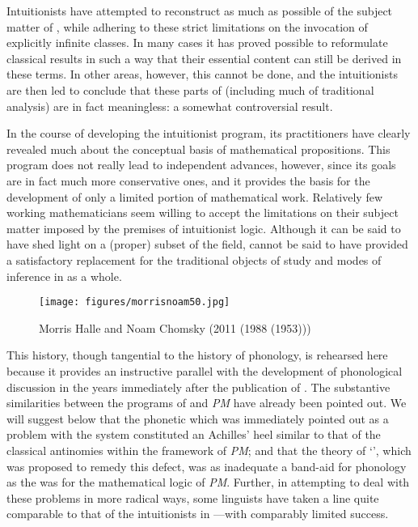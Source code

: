 Intuitionists have attempted to reconstruct as much as possible of the
subject matter of , while adhering to these strict
limitations on the invocation of explicitly infinite classes. In many
cases it has proved possible to reformulate classical results in such
a way that their essential content can still be derived in these
terms. In other areas, however, this cannot be done, and the
intuitionists are then led to conclude that these parts of 
(including much of traditional analysis) are in fact meaningless: a
somewhat controversial result.

In the course of developing the intuitionist program, its
practitioners have clearly revealed much about the conceptual basis of
mathematical propositions. This program does not really lead to
independent advances, however, since its goals are in fact much more
conservative ones, and it provides the basis for the development of
only a limited portion of mathematical work. Relatively few working
mathematicians seem willing to accept the limitations on their subject
matter imposed by the premises of intuitionist logic. Although it can
be said to have shed light on a (proper) subset of the field,
 cannot be said to have provided a satisfactory
replacement for the traditional objects of study and modes of
inference in  as a whole.

\begin{wrapfigure}{l}{.45\textwidth}
  \texttt{[image: figures/morrisnoam50.jpg]}
  \caption{Morris Halle and Noam Chomsky (2011 (1988 (1953)))}
  \label{fig:ch.spe.morrisnoam50}
\end{wrapfigure}
This history, though tangential to the history of phonology, is
rehearsed here because it provides an instructive parallel with the
development of phonological discussion in the years immediately after
the publication of \textsl{}. The substantive similarities between
the programs of \textsl{} and \textsl{PM} have already been pointed
out. We will suggest below that the phonetic  which was
immediately pointed out as a problem with the \textsl{} system
constituted an Achilles' heel similar to that of the classical
antinomies within the framework of \textsl{PM}; and that the theory of
`', which was proposed to remedy this defect, was as
inadequate a band-aid for phonology as the  was for the
mathematical logic of \textsl{PM}. Further, in attempting to deal with
these problems in more radical ways, some linguists have taken a line
quite comparable to that of the intuitionists in —with
comparably limited success.

